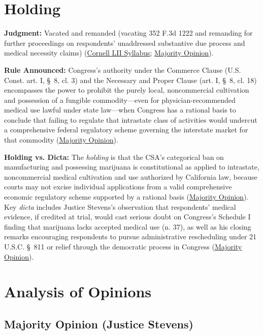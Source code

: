 \documentclass[12pt]{article}
\begin{document}
\section{Holding}

\textbf{Judgment:} Vacated and remanded (vacating 352 F.3d 1222 and remanding for further proceedings on respondents' unaddressed substantive due process and medical necessity claims) (\href{https://www.law.cornell.edu/supct/html/03-1454.ZS.html}{Cornell LII Syllabus}; \href{https://www.law.cornell.edu/supct/html/03-1454.ZO.html}{Majority Opinion}).

\textbf{Rule Announced:} Congress's authority under the Commerce Clause (U.S. Const. art. I, \S\ 8, cl. 3) and the Necessary and Proper Clause (art. I, \S\ 8, cl. 18) encompasses the power to prohibit the purely local, noncommercial cultivation and possession of a fungible commodity---even for physician-recommended medical use lawful under state law---when Congress has a rational basis to conclude that failing to regulate that intrastate class of activities would undercut a comprehensive federal regulatory scheme governing the interstate market for that commodity (\href{https://www.law.cornell.edu/supct/html/03-1454.ZO.html}{Majority Opinion}).

\textbf{Holding vs. Dicta:} The \textit{holding} is that the CSA's categorical ban on manufacturing and possessing marijuana is constitutional as applied to intrastate, noncommercial medical cultivation and use authorized by California law, because courts may not excise individual applications from a valid comprehensive economic regulatory scheme supported by a rational basis (\href{https://www.law.cornell.edu/supct/html/03-1454.ZO.html}{Majority Opinion}). Key \textit{dicta} includes Justice Stevens's observation that respondents' medical evidence, if credited at trial, would cast serious doubt on Congress's Schedule I finding that marijuana lacks accepted medical use (n. 37), as well as his closing remarks encouraging respondents to pursue administrative rescheduling under 21 U.S.C. \S\ 811 or relief through the democratic process in Congress (\href{https://www.law.cornell.edu/supct/html/03-1454.ZO.html}{Majority Opinion}).

\section{Analysis of Opinions}

\subsection{Majority Opinion (Justice Stevens)}
\end{document}
